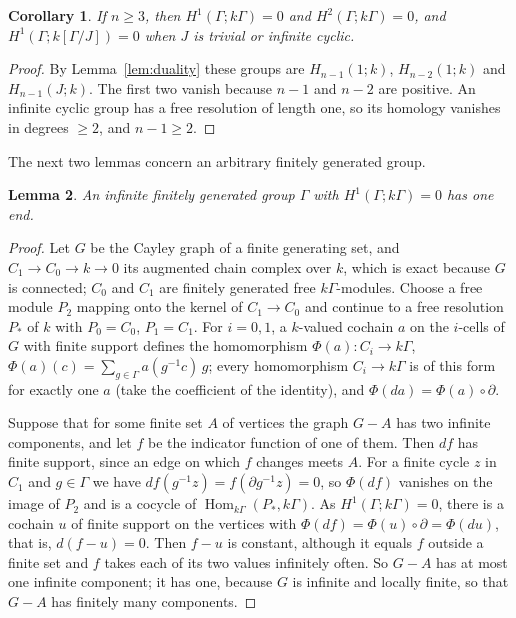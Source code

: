 \documentclass[11pt,a4paper]{article}
\newtheorem{lemma}{Lemma}[section]
\newtheorem{corollary}[lemma]{Corollary}
\theoremstyle{definition}
\theoremstyle{remark}
\newcommand{\Gam}{\Gamma}
\newcommand{\Hom}{\operatorname{Hom}}
\begin{document}
\begin{corollary}\label{cor:vanishing}
If $n\ge3$, then $H^1(\Gam;k\Gam)=0$ and $H^2(\Gam;k\Gam)=0$, and $H^1(\Gam;k[\Gam/J])=0$ when
$J$ is trivial or infinite cyclic.
\end{corollary}
\begin{proof}
By Lemma~\ref{lem:duality} these groups are $H_{n-1}(1;k)$, $H_{n-2}(1;k)$ and
$H_{n-1}(J;k)$. The first two vanish because $n-1$ and $n-2$ are positive. An
infinite cyclic group has a free resolution of length one, so its homology
vanishes in degrees $\ge2$, and $n-1\ge2$.
\end{proof}

The next two lemmas concern an arbitrary finitely generated group.

\begin{lemma}\label{lem:oneend}
An infinite finitely generated group $\Gam$ with $H^1(\Gam;k\Gam)=0$ has one end.
\end{lemma}
\begin{proof}
Let $G$ be the Cayley graph of a finite generating set, and
$C_1\to C_0\to k\to0$ its augmented chain complex over $k$, which is exact
because $G$ is connected; $C_0$ and $C_1$ are finitely generated free
$k\Gam$-modules. Choose a free module $P_2$ mapping onto the kernel of
$C_1\to C_0$ and continue to a free resolution $P_*$ of $k$ with $P_0=C_0$,
$P_1=C_1$. For $i=0,1$, a $k$-valued cochain $a$ on the $i$-cells of $G$ with
finite support defines the homomorphism
$\Phi(a):C_i\to k\Gam$, $\Phi(a)(c)=\sum_{g\in\Gam}a(g^{-1}c)\,g$; every homomorphism
$C_i\to k\Gam$ is of this form for exactly one $a$ (take the coefficient of the
identity), and $\Phi(da)=\Phi(a)\circ\partial$.

Suppose that for some finite set $A$ of vertices the graph $G-A$ has two infinite
components, and let $f$ be the indicator function of one of them. Then $df$ has
finite support, since an edge on which $f$ changes meets $A$. For a finite cycle
$z$ in $C_1$ and $g\in\Gam$ we have $df(g^{-1}z)=f(\partial g^{-1}z)=0$, so
$\Phi(df)$ vanishes on the image of $P_2$ and is a cocycle of
$\Hom_{k\Gam}(P_*,k\Gam)$. As $H^1(\Gam;k\Gam)=0$, there is a cochain $u$ of finite
support on the vertices with $\Phi(df)=\Phi(u)\circ\partial=\Phi(du)$, that is,
$d(f-u)=0$. Then $f-u$ is constant, although it equals $f$ outside a finite set
and $f$ takes each of its two values infinitely often. So $G-A$ has at most one
infinite component; it has one, because $G$ is infinite and locally finite, so
that $G-A$ has finitely many components.
\end{proof}
\end{document}
